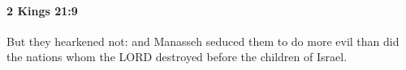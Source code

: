 
		\paragraph{2 Kings 21:9} %
			\label{2KINGS-21-9}

			But they hearkened not: and Manasseh seduced them to do more evil than did the nations whom the LORD destroyed before the children of Israel.


